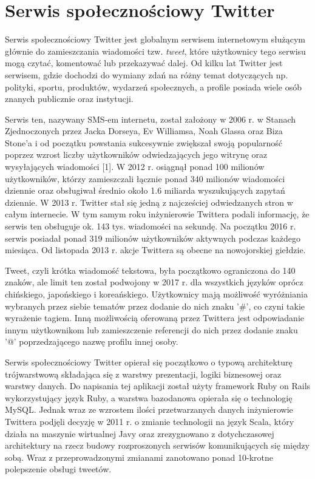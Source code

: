 \chapter{Serwis społecznościowy Twitter}
\qquad Serwis spo\l{}eczno\'sciowy Twitter jest globalnym serwisem internetowym s\l{}u\.z\k{a}cym g\l{}\'ownie do zamieszczania wiadomo\'sci tzw. \textit{tweet}, kt\'ore u\.zytkownicy tego serwisu mog\k{a} czytać, komentowa\'c lub przekazywa\'c dalej. Od kilku lat Twitter jest serwisem, gdzie dochodzi do wymiany zdań na różny temat dotyczących np. polityki, sportu, produktów, wydarzeń społecznych, a profile posiada wiele osób znanych publicznie oraz instytucji.

Serwis ten, nazywany SMS-em internetu, zosta\l{} za\l{}o\.zony w 2006 r. w Stanach Zjednoczonych przez Jacka Dorseya, Ev Williamsa, Noah Glassa oraz Biza Stone’a i od początku powstania sukcesywnie zwi\k{e}ksza\l{} swoj\k{a} popularno\'s\'c poprzez wzrost liczby u\.zytkownik\'ow odwiedzaj\k{a}cych jego witryn\k{e} oraz wysy\l{}aj\k{a}cych wiadomo\'sci [1]. W 2012 r. osiągnął ponad 100 milionów użytkowników, którzy zamieszczali łącznie ponad 340 milionów wiadomo\'sci dziennie oraz obsługiwał \'srednio około 1.6 miliarda wyszukujących zapytań dziennie. W 2013 r. Twitter stał si\k{e} jedną z najcze\'sciej odwiedzanych stron w całym internecie. W tym samym roku inżynierowie Twittera podali informację, że serwis ten obsługuje ok. 143 tys. wiadomości na sekundę. Na początku 2016 r. serwis posiadał ponad 319 milionów użytkowników aktywnych podczas każdego miesiąca. Od listopada 2013 r. akcje Twittera są obecne na nowojorskiej giełdzie.

Tweet, czyli krótka wiadomość tekstowa, by\l{}a pocz\k{a}tkowo ograniczona do 140 znak\'ow, ale limit ten zosta\l{} podwojony w 2017 r. dla wszystkich j\k{e}zyk\'ow opr\'ocz chi\'nskiego, japo\'nskiego i korea\'nskiego. Użytkownicy mają możliwość wyróżniania wybranych przez siebie tematów przez dodanie do nich znaku '\#', co czyni takie wyrażenie tagiem. Inną możliwością oferowaną przez Twittera jest odpowiadanie innym użytkownikom lub zamieszczenie referencji do nich przez dodanie znaku '@' poprzedzającego nazwę profilu innej osoby.

Serwis społecznościowy Twitter opierał się początkowo o typową architekturę trójwarstwową składająca się z warstwy prezentacji, logiki biznesowej oraz warstwy danych. Do napisania tej aplikacji został użyty framework Ruby on Rails wykorzystujący język Ruby, a warstwa bazodanowa opierała się o technologię MySQL. Jednak wraz ze wzrostem ilości przetwarzanych danych inżynierowie Twittera podjęli decyzję w 2011 r. o zmianie technologii na język Scala, który działa na maszynie wirtualnej Javy oraz zrezygnowano z dotychczasowej architektury na rzecz budowy rozproszonych serwisów komunikujących się między sobą. Wraz z przeprowadzonymi zmianami zanotowano ponad 10-krotne polepszenie obsługi tweetów. 

